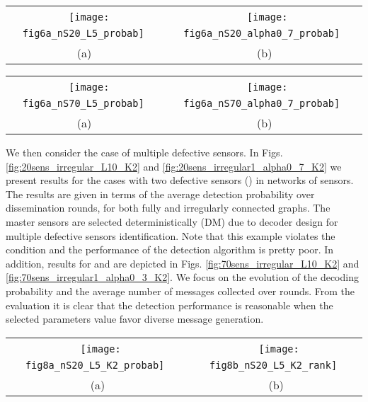 \documentclass[journal]{IEEEtran}
\begin{document}
\begin{figure*}[thb]
\begin{center}
\begin{tabular}{cc}
~\texttt{[image: fig6a\_nS20\_L5\_probab]}~&
~\texttt{[image: fig6a\_nS20\_alpha0\_7\_probab]}~\\
~(a) ~&~(b)~\\
\end{tabular}
\end{center}
\caption{Probability of defective sensor detection; Simulation results for irregular graphs () and random selection (RM) of  sensors, . (a)  master sensors; (b) sensor participation constant .}
\label{fig:20sens_irregular1_alpha0_7}
\end{figure*}
\begin{figure*}[htb]
\begin{center}
\begin{tabular}{cc}
~\texttt{[image: fig6a\_nS70\_L5\_probab]}~&
~\texttt{[image: fig6a\_nS70\_alpha0\_7\_probab]}~\\
~(a) ~&~(b)~\\
\end{tabular}
\end{center}
\caption{Probability of defective sensor detection; Simulation results for irregular graphs () and random selection (RM) of  sensors, . (a)  master sensors; (b) sensor participation constant .}
\label{fig:70sens_irregular1_alpha0_7}
\end{figure*}
We then consider the case of multiple defective sensors. In Figs. \ref{fig:20sens_irregular_L10_K2} and \ref{fig:20sens_irregular1_alpha0_7_K2} we present results for the cases with two defective sensors () in networks of  sensors. The results are given in terms of the average detection probability over dissemination rounds, for both fully and irregularly connected graphs. The master sensors are selected deterministically (DM) due to decoder design for multiple defective sensors identification. Note that this example violates the condition  and the performance of the detection algorithm is pretty poor. In addition, results for  and  are depicted in Figs. \ref{fig:70sens_irregular_L10_K2} and \ref{fig:70sens_irregular1_alpha0_3_K2}. We focus on the evolution of the decoding probability and the average number of messages collected over rounds. From the evaluation it is clear that the detection performance is reasonable when the selected parameters value  favor diverse message generation. 
\begin{figure*}[htb]
\begin{center}
\begin{tabular}{cc}
~\texttt{[image: fig8a\_nS20\_L5\_K2\_probab]}~&
~\texttt{[image: fig8b\_nS20\_L5\_K2\_rank]}~\\
~(a)~&~(b)~\\\end{tabular}
\end{center}
\caption{Simulation results for fully connected (FG) and irregular graphs (IG),  with  sensors,  and deterministic selection (DM) of  master sensors: (a) Probability of defective sensor detection; (b) Average rank value.}
\label{fig:20sens_irregular_L10_K2}
\end{figure*}
\end{document}
